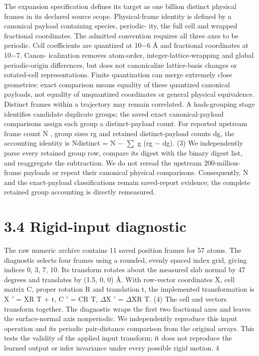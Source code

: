\documentclass[11pt]{article}
\begin{document}
The expansion specification defines its target as one billion distinct physical frames in its declared
source scope. Physical-frame identity is defined by a canonical payload containing species, periodic-
ity, the full cell and wrapped fractional coordinates. The admitted convention requires all three axes
to be periodic. Cell coefficients are quantized at 10\ensuremath{-}6 Å and fractional coordinates at 10\ensuremath{-}7. Canon-
icalization removes atom-order, integer-lattice-wrapping and global periodic-origin differences, but
does not canonicalize lattice-basis changes or rotated-cell representations. Finite quantization can
merge extremely close geometries: exact comparison means equality of these quantized canonical
payloads, not equality of unquantized coordinates or general physical equivalence. Distinct frames
within a trajectory may remain correlated. A hash-grouping stage identifies candidate duplicate
groups; the saved exact canonical-payload comparisons assign each group a distinct-payload count.
For reported upstream frame count N , group sizes rg and retained distinct-payload counts dg, the
accounting identity is
Ndistinct = N \ensuremath{-}
\ensuremath{\sum}
g
(rg \ensuremath{-} dg). (3)
We independently parse every retained group row, compare its digest with the binary digest list,
and reaggregate the subtraction. We do not reread the upstream 200-million-frame payloads or
repeat their canonical physical comparisons. Consequently, N and the exact-payload classifications
remain saved-report evidence; the complete retained group accounting is directly remeasured.

\section*{3.4 Rigid-input diagnostic}

The raw numeric archive contains 11 saved position frames for 57 atoms. The diagnostic selects four
frames using a rounded, evenly spaced index grid, giving indices 0, 3, 7, 10. Its transform rotates
about the measured slab normal by 47 degrees and translates by (1.5, 0, 0) Å. With row-vector
coordinates X, cell matrix C, proper rotation R and translation t, the implemented transformation
is
X \ensuremath{\prime} = XR T + t, C \ensuremath{\prime} = CR T, \ensuremath{\Delta}X \ensuremath{\prime} = \ensuremath{\Delta}XR T. (4)
The cell and vectors transform together. The diagnostic wraps the first two fractional axes and
leaves the surface-normal axis nonperiodic. We independently reproduce this input operation and
its periodic pair-distance comparison from the original arrays. This tests the validity of the applied
input transform; it does not reproduce the learned output or infer invariance under every possible
rigid motion.
4
\end{document}
